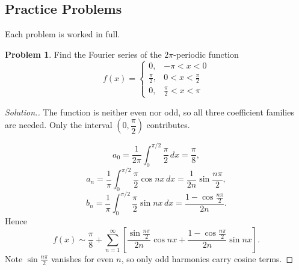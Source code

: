 \documentclass[11pt,a4paper]{article}
\theoremstyle{definition}
\newtheorem{problemx}{Problem}[subsection]
\newenvironment{problem}{\begin{problemx}}{\end{problemx}}
\newenvironment{solution}
  {\renewcommand{\qedsymbol}{}\begin{proof}[\textit{Solution}.]}
  {\end{proof}}
\begin{document}
\subsection{Practice Problems}

Each problem is worked in full.

\begin{problem}
Find the Fourier series of the $2\pi$-periodic function
\[f(x) = \begin{cases}
0, & -\pi<x<0\\
\frac{\pi}{2}, & 0<x<\frac{\pi}{2}\\
0, & \frac{\pi}{2}<x<\pi
\end{cases}\]
\end{problem}
\begin{solution}
The function is neither even nor odd, so all three coefficient families are
needed. Only the interval $\left(0,\dfrac{\pi}{2}\right)$ contributes.

\[a_0 = \frac{1}{2\pi}\int_0^{\pi/2}\frac{\pi}{2}\,dx = \frac{\pi}{8},\]
\[a_n = \frac1\pi\int_0^{\pi/2}\frac{\pi}{2}\cos nx\,dx
= \frac{1}{2n}\sin\frac{n\pi}{2},\]
\[b_n = \frac1\pi\int_0^{\pi/2}\frac{\pi}{2}\sin nx\,dx
= \frac{1-\cos\frac{n\pi}{2}}{2n}.\]
Hence
\[f(x) \sim \frac{\pi}{8}
+ \sum_{n=1}^{\infty}\left[\frac{\sin\frac{n\pi}{2}}{2n}\cos nx
+ \frac{1-\cos\frac{n\pi}{2}}{2n}\sin nx\right].\]
Note $\sin\frac{n\pi}{2}$ vanishes for even $n$, so only odd harmonics carry
cosine terms.
\end{solution}
\end{document}

